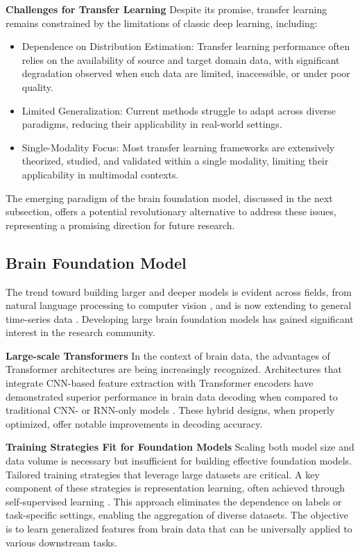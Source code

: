 \documentclass[journal]{IEEEtran}
\begin{document}
\textbf{Challenges for Transfer Learning} Despite its promise, transfer learning remains constrained by the limitations of classic deep learning, including:
\begin{itemize}
\item Dependence on Distribution Estimation: Transfer learning performance often relies on the availability of source and target domain data, with significant degradation observed when such data are limited, inaccessible, or under poor quality.
\item Limited Generalization: Current methods struggle to adapt across diverse paradigms, reducing their applicability in real-world settings.
\item Single-Modality Focus: Most transfer learning frameworks are extensively theorized, studied, and validated within a single modality, limiting their applicability in multimodal contexts.
\end{itemize}
The emerging paradigm of the brain foundation model, discussed in the next subsection, offers a potential revolutionary alternative to address these issues, representing a promising direction for future research.

\subsection{Brain Foundation Model} \label{sect:foundation}

The trend toward building larger and deeper models is evident across fields, from natural language processing \cite{Brown2020} to computer vision \cite{Radford2021}, and is now extending to general time-series data \cite{Wang2024a}. Developing large brain foundation models has gained significant interest in the research community.

\textbf{Large-scale Transformers}  In the context of brain data, the advantages of Transformer architectures are being increasingly recognized. Architectures that integrate CNN-based feature extraction with Transformer encoders have demonstrated superior performance in brain data decoding when compared to traditional CNN- or RNN-only models \cite{Schirrmeister2017, Lawhern2018EEGNet, Sakhavi2018, Song2020, Ding2023, Ding2024, Ding2024a}. These hybrid designs, when properly optimized, offer notable improvements in decoding accuracy.

\textbf{Training Strategies Fit for Foundation Models} Scaling both model size and data volume is necessary but insufficient for building effective foundation models. Tailored training strategies that leverage large datasets are critical. A key component of these strategies is representation learning, often achieved through self-supervised learning \cite{Liu2023b}. This approach eliminates the dependence on labels or task-specific settings, enabling the aggregation of diverse datasets. The objective is to learn generalized features from brain data that can be universally applied to various downstream tasks.
\end{document}
